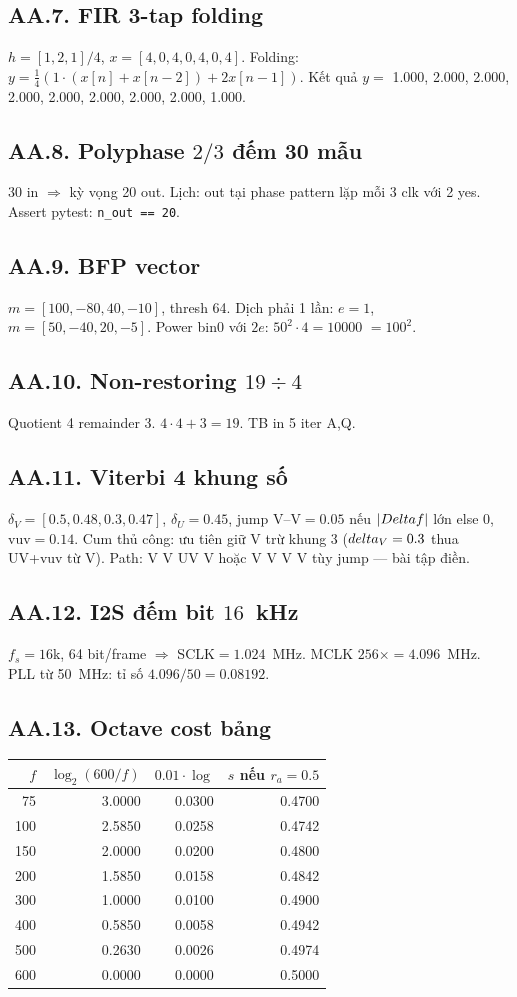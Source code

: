 \subsection*{AA.7. FIR 3-tap folding}
$h=[1,2,1]/4$, $x=[4,0,4,0,4,0,4]$. Folding: $y=\frac14(1\cdot(x[n]+x[n-2])+2x[n-1])$.
Kết quả $y=$ 1.000, 2.000, 2.000, 2.000, 2.000, 2.000, 2.000, 2.000, 1.000.
\subsection*{AA.8. Polyphase $2/3$ đếm 30 mẫu}
30 in $\Rightarrow$ kỳ vọng 20 out. Lịch: out tại phase pattern lặp mỗi 3 clk với 2 yes.
Assert pytest: \texttt{n\_out == 20}.
\subsection*{AA.9. BFP vector}
$m=[100,-80,40,-10]$, thresh 64. Dịch phải 1 lần: $e=1$, $m=[50,-40,20,-5]$. Power bin0 với $2e$: $50^2\cdot4=10000$ $=100^2$.
\subsection*{AA.10. Non-restoring $19\div4$}
Quotient 4 remainder 3. $4\cdot4+3=19$. TB in 5 iter A,Q.
\subsection*{AA.11. Viterbi 4 khung số}
$\delta_V=[0.5,0.48,0.3,0.47]$, $\delta_U=0.45$, jump V--V$=0.05$ nếu $|\\Delta f|$ lớn else 0, vuv$=0.14$.
Cum thủ công: ưu tiên giữ V trừ khung 3 ($\\delta_V=0.3$ thua UV+vuv từ V). Path: V V UV V hoặc V V V V tùy jump --- bài tập điền.
\subsection*{AA.12. I2S đếm bit $16$~kHz}
$f_s=16$k, 64 bit/frame $\Rightarrow$ SCLK$=1.024$~MHz. MCLK $256\times=4.096$~MHz. PLL từ 50~MHz: tỉ số $4.096/50=0.08192$.
\subsection*{AA.13. Octave cost bảng}
\begin{center}\small\begin{tabular}{@{}rrrr@{}}
\toprule $f$ & $\log_2(600/f)$ & $0.01\cdot\log$ & $s$ nếu $r_a=0.5$ \\ \midrule
75 & 3.0000 & 0.0300 & 0.4700 \\
100 & 2.5850 & 0.0258 & 0.4742 \\
150 & 2.0000 & 0.0200 & 0.4800 \\
200 & 1.5850 & 0.0158 & 0.4842 \\
300 & 1.0000 & 0.0100 & 0.4900 \\
400 & 0.5850 & 0.0058 & 0.4942 \\
500 & 0.2630 & 0.0026 & 0.4974 \\
600 & 0.0000 & 0.0000 & 0.5000 \\
\bottomrule\end{tabular}\end{center}
